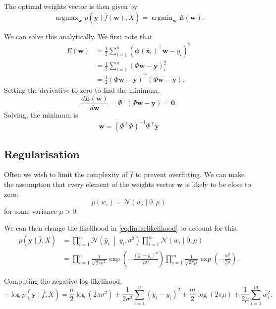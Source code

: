 \documentclass[11pt]{report}
\newcommand\bw{\mathbf{w}}
\newcommand\bx{\mathbf{x}}
\newcommand\by{\mathbf{y}}
\newcommand\bphi{\bm{\phi}}
\newcommand\cN{\mathcal{N}}
\DeclareMathOperator*{\argmax}{argmax}
\DeclareMathOperator*{\argmin}{argmin}
\begin{document}
The optimal weights vector is then given by \[
    \argmax_{\bw} p(\by \mid \hat f(\bw), X) = \argmin_{\bw} E(\bw) \text{.}
\]

We can solve this analytically. We first note that \begin{align*}
    E(\bw) &= \frac12\sum_{i = 1}^{n}(\bphi(\bx_i)^\top \bw - y_i)^2 \\
    &= \frac12\sum_{i = 1}^{n}(\Phi \bw - \by)_i^2 \\
    &= \frac12(\Phi \bw - \by)^\top(\Phi \bw - \by) \text{.}
\end{align*} Setting the derivative to zero to find the minimum, \[
    \frac{dE(\bw)}{d\bw} = \Phi^\top (\Phi\bw - \by) = \mathbf{0} \text{.}
\] Solving, the minimum is \[
    \bw  = \left(\Phi^\top\Phi\right)^{-1}\Phi^\top\by
\]

\subsection{Regularisation}
Often we wish to limit the complexity of $\hat f$ to prevent overfitting. We can make the assumption that every element of the weights vector $\bw$ is likely to be close to zero: \[
    p(w_i) = \cN(w_i \mid 0, \mu)
\] for some variance $\mu > 0$.

We can then change the likelihood in \cref{eq:linearlikelihood} to account for this: \begin{align*}
    p(\by \mid \hat f, X) &= \prod_{i = 1}^{n} \cN\left(\hat y_i \;\middle|\; y_i, \sigma^2\right) \label{eq:linearlikelihood} \prod_{i = 1}^{m}\cN(w_i \mid 0, \mu) \\
    &= \prod_{i = 1}^{n} \frac{1}{\sqrt{2\pi\sigma^2}} \exp\left(-\frac{\left(\hat y_i - y_i\right)^2}{2\sigma^2}\right) \prod_{i = 1}^{m}\frac{1}{\sqrt{2\pi\mu}} \exp\left(-\frac{w_i^2}{2\mu}\right) \text{.}
\end{align*}

Computing the negative log likelihood,\[
    -\log p(\by \mid \hat f, X) = \frac{n}{2}\log\left(2\pi\sigma^2\right) + \frac{1}{2\sigma^2}\sum_{i=1}^{n}\left(\hat y_i - y_i\right)^2 + \frac{m}{2}\log\left(2\pi\mu\right) + \frac{1}{2\mu}\sum_{i=1}^{m}w_i^2 \text{.}
\]
\end{document}
